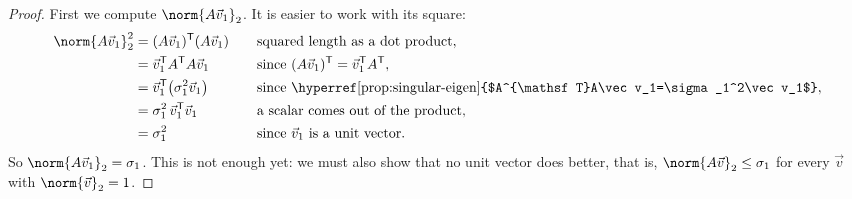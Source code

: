 \documentclass[a4paper,12pt,oneside]{report}
\begin{document}
\begin{proof}
First we compute $\norm{A\vec v_1}_2$. It is easier to work with its
square:
\[
\begin{aligned}
  \norm{A\vec v_1}_2^2
    &=(A\vec v_1)^{\mathsf T}(A\vec v_1)
      &&\quad\text{squared length as a dot product},\\
    &=\vec v_1^{\mathsf T}A^{\mathsf T}A\vec v_1
      &&\quad\text{since } (A\vec v_1)^{\mathsf T}=\vec v_1^{\mathsf T}A^{\mathsf T},\\
    &=\vec v_1^{\mathsf T}\bigl(\sigma_1^2\vec v_1\bigr)
      &&\quad\text{since \hyperref[prop:singular-eigen]{$A^{\mathsf T}A\vec v_1=\sigma_1^2\vec v_1$}},\\
    &=\sigma_1^2\,\vec v_1^{\mathsf T}\vec v_1
      &&\quad\text{a scalar comes out of the product},\\
    &=\sigma_1^2
      &&\quad\text{since } \vec v_1 \text{ is a unit vector}.
\end{aligned}
\]
So $\norm{A\vec v_1}_2=\sigma_1$. This is not enough yet: we must
also show that no unit vector does better, that is,
$\norm{A\vec v}_2\leq\sigma_1$ for every $\vec v$ with
$\norm{\vec v}_2=1$.


\end{proof}
\end{document}
